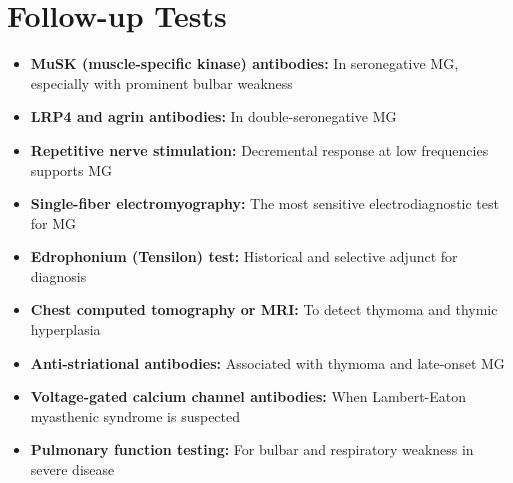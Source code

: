 \section*{Follow-up Tests}
\begin{itemize}
  \item \textbf{MuSK (muscle-specific kinase) antibodies:} In seronegative MG, especially with prominent bulbar weakness
  \item \textbf{LRP4 and agrin antibodies:} In double-seronegative MG
  \item \textbf{Repetitive nerve stimulation:} Decremental response at low frequencies supports MG
  \item \textbf{Single-fiber electromyography:} The most sensitive electrodiagnostic test for MG
  \item \textbf{Edrophonium (Tensilon) test:} Historical and selective adjunct for diagnosis
  \item \textbf{Chest computed tomography or MRI:} To detect thymoma and thymic hyperplasia
  \item \textbf{Anti-striational antibodies:} Associated with thymoma and late-onset MG
  \item \textbf{Voltage-gated calcium channel antibodies:} When Lambert-Eaton myasthenic syndrome is suspected
  \item \textbf{Pulmonary function testing:} For bulbar and respiratory weakness in severe disease
\end{itemize}

